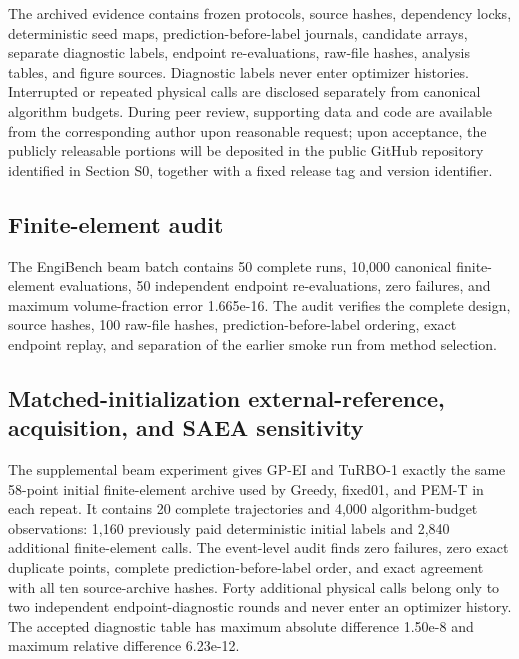 \documentclass[cmc,article,submit,moreauthors,pdftex]{Definitions/tsp}
\begin{document}
The archived evidence contains frozen protocols, source hashes, dependency locks, deterministic seed maps, prediction-before-label journals, candidate arrays, separate diagnostic labels, endpoint re-evaluations, raw-file hashes, analysis tables, and figure sources. Diagnostic labels never enter optimizer histories. Interrupted or repeated physical calls are disclosed separately from canonical algorithm budgets. During peer review, supporting data and code are available from the corresponding author upon reasonable request; upon acceptance, the publicly releasable portions will be deposited in the public GitHub repository identified in Section S0, together with a fixed release tag and version identifier.

\hypertarget{finite-element-audit}{%
\subsection{Finite-element audit}\label{finite-element-audit}}

The EngiBench beam batch contains 50 complete runs, 10,000 canonical finite-element evaluations, 50 independent endpoint re-evaluations, zero failures, and maximum volume-fraction error 1.665e-16. The audit verifies the complete design, source hashes, 100 raw-file hashes, prediction-before-label ordering, exact endpoint replay, and separation of the earlier smoke run from method selection.

\hypertarget{matched-initialization-external-reference-acquisition-and-saea-sensitivity}{%
\subsection{Matched-initialization external-reference, acquisition, and SAEA sensitivity}\label{matched-initialization-external-reference-acquisition-and-saea-sensitivity}}

The supplemental beam experiment gives GP-EI and TuRBO-1 exactly the same 58-point initial finite-element archive used by Greedy, fixed01, and PEM-T in each repeat. It contains 20 complete trajectories and 4,000 algorithm-budget observations: 1,160 previously paid deterministic initial labels and 2,840 additional finite-element calls. The event-level audit finds zero failures, zero exact duplicate points, complete prediction-before-label order, and exact agreement with all ten source-archive hashes. Forty additional physical calls belong only to two independent endpoint-diagnostic rounds and never enter an optimizer history. The accepted diagnostic table has maximum absolute difference 1.50e-8 and maximum relative difference 6.23e-12.
\end{document}
